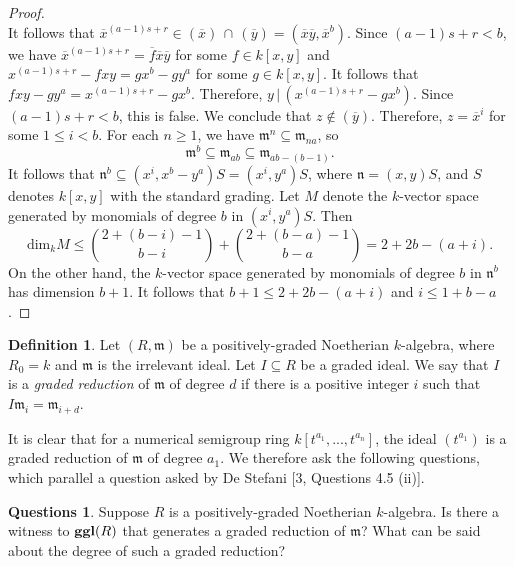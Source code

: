 \documentclass{amsart}
\theoremstyle{definition}
\theoremstyle{definition}
\newtheorem{definition}[theorem]{Definition}
\newtheorem{questions}[theorem]{Questions}
\DeclareMathOperator{\ggl}{\bf{ggl}}
\numberwithin{equation}{section}
\theoremstyle{definition}
\begin{document}
{\begin{proof}
\[\]\text{}\newline It follows that $\overline{x}^{(a-1)s+r} \in (\overline{x})\, \cap\, (\overline{y})=(\overline{x}\overline{y}, \overline{x}^{b})$. Since $(a-1)s+r<b$, we have $\overline{x}^{(a-1)s+r}=\overline{f}\overline{x}\overline{y}$ for some $f \in k[x,y]$ and $x^{(a-1)s+r}-fxy=gx^{b}-gy^{a}$ for some $g \in k[x,y]$. It follows that 
$fxy-gy^a=x^{(a-1)s+r}-gx^b$. 
Therefore, $y\,|\,(x^{(a-1)s+r}-gx^{b})$. Since $(a-1)s+r<b$, this is false. We conclude that $z \not\in (\overline{y})$. \newline\newline Therefore, $z=\overline{x}^{i}$ for some $1 \leq i<b$. For each $n \geq 1$, we have $\mathfrak{m}^{n} \subseteq \mathfrak{m}_{na}$, so  
\[
\mathfrak{m}^{b} \subseteq \mathfrak{m}_{ab} \subseteq \mathfrak{m}_{ab-(b-1)}.
\]
It follows that $\mathfrak{n}^{b} \subseteq (x^i,x^b-y^a)S=(x^i,y^a)S$, where $\mathfrak{n}=(x,y)S$, and $S$ denotes $k[x,y]$ with the standard grading. Let $M$ denote the $k$-vector space generated by monomials of degree $b$ in $(x^i, y^a)S$. Then 
\[\text{dim}_{k}M \leq \binom{2+(b-i)-1}{b-i}+\binom{2+(b-a)-1}{b-a}=2+2b-(a+i).
\] On the other hand, the $k$-vector space generated by monomials of degree $b$ in $\mathfrak{n}^{b}$ has dimension $b+1$. It follows that $b+1 \leq 2+2b-(a+i)$ and $i \leq 1+b-a$.
\end{proof}\text{} 
\begin{definition}
Let $(R,\mathfrak{m})$ be a positively-graded Noetherian $k$-algebra, where $R_{0}=k$ and $\mathfrak{m}$ is the irrelevant ideal. Let $I \subseteq R$ be a graded ideal. We say that $I$ is a {\it{graded reduction}} of $\mathfrak{m}$ of degree $d$ if there is a positive integer $i$ such that $I\mathfrak{m}_{i}=\mathfrak{m}_{i+d}$. 
\end{definition}\text{}\newline 
It is clear that for a numerical semigroup ring $k[t^{a_{1}},...,t^{a_{n}}]$, the ideal $(t^{a_{1}})$ is a graded reduction of $\mathfrak{m}$ of degree $a_{1}$. We therefore ask the following questions, which parallel a question asked by De Stefani [3, Questions 4.5 (ii)]. \newline
\begin{questions}
Suppose $R$ is a positively-graded Noetherian $k$-algebra. Is there a witness to $\ggl(R)$ that generates a graded reduction of $\mathfrak{m}$? What can be said about the degree of such a graded reduction?  
\end{questions}

}
\end{document}
